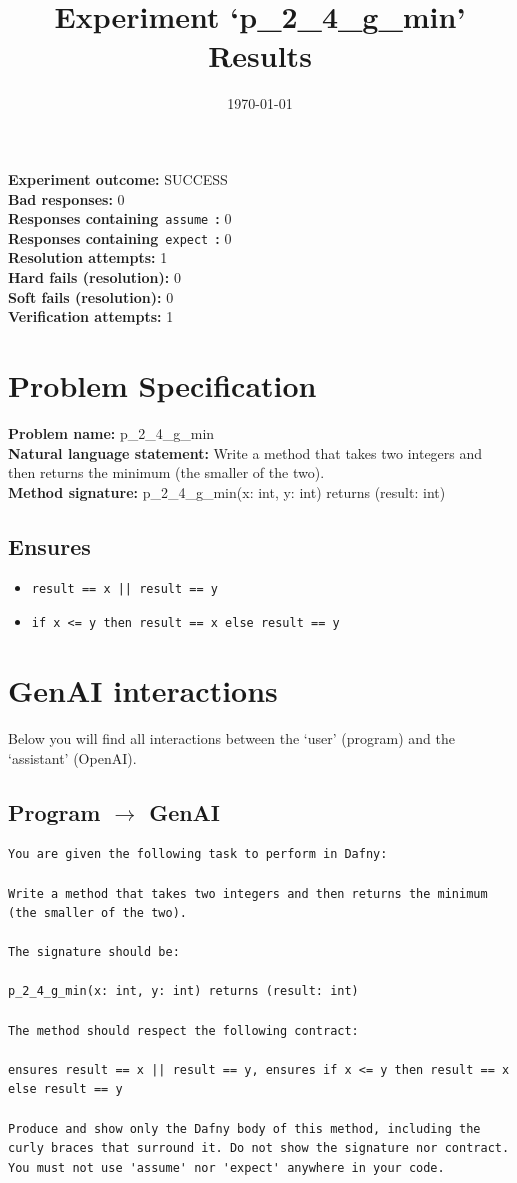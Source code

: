 \documentclass{article}
\begin{document}
\title{Experiment `p\_2\_4\_g\_min' Results}
\author{\today}
\date{}
\maketitle
\textbf{Experiment outcome: }SUCCESS
\\\textbf{Bad responses: }0
\\\textbf{Responses containing}~\texttt{assume}~\textbf{: }0
\\\textbf{Responses containing}~\texttt{expect}~\textbf{: }0
\\\textbf{Resolution attempts: }1
\\\textbf{Hard fails (resolution): }0
\\\textbf{Soft fails (resolution): }0
\\\textbf{Verification attempts: }1
\section*{Problem Specification}
\textbf{Problem name: }p\_2\_4\_g\_min
\\\textbf{Natural language statement: }Write a method that takes two integers and then returns the minimum (the smaller of the two).
\\\textbf{Method signature: }p\_2\_4\_g\_min(x: int, y: int) returns (result: int)
\subsection*{Ensures}
\begin{itemize}
\item \texttt{result == x || result == y}
\item \texttt{if x <= y then result == x else result == y}
\end{itemize}
\clearpage
\section*{GenAI interactions}
Below you will find all interactions between the `user' (program) and the `assistant' (OpenAI).
\subsection*{Program $\rightarrow$ GenAI}
\begin{lstlisting}
You are given the following task to perform in Dafny:

Write a method that takes two integers and then returns the minimum (the smaller of the two).

The signature should be:

p_2_4_g_min(x: int, y: int) returns (result: int)

The method should respect the following contract:

ensures result == x || result == y, ensures if x <= y then result == x else result == y

Produce and show only the Dafny body of this method, including the curly braces that surround it. Do not show the signature nor contract. You must not use 'assume' nor 'expect' anywhere in your code.
\end{lstlisting}
\end{document}
